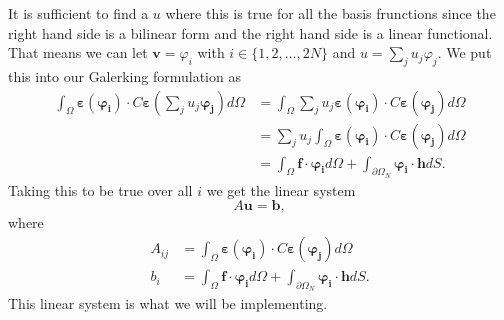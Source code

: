 \documentclass[paper=a4, fontsize=11pt]{scrartcl} %
\begin{document}
It is sufficient to find a $u$ where this is true for all the basis frunctions since the right hand side is a bilinear form and the right hand side is a linear functional. That means we can let $\boldsymbol{v} = \varphi_i$ with $i\in\{1,2,\ldots,2N\}$ and $u = \sum_j u_j\varphi_j$. We put this into our Galerking formulation as
\begin{align*}
\int_{\Omega}\boldsymbol{\varepsilon}(\boldsymbol{\varphi_i})\cdot C\boldsymbol{\varepsilon}\left(\sum_j u_j\boldsymbol{\varphi_j}\right)d\Omega &= \int_{\Omega}\sum_j u_j\boldsymbol{\varepsilon}(\boldsymbol{\varphi_i})\cdot C\boldsymbol{\varepsilon}(\boldsymbol{\varphi_j})d\Omega \\
&=\sum_j u_j\int_{\Omega}\boldsymbol{\varepsilon}(\boldsymbol{\varphi_i})\cdot C\boldsymbol{\varepsilon}(\boldsymbol{\varphi_j})d\Omega \\
&= \int_{\Omega}\boldsymbol{f}\cdot \boldsymbol{\varphi_i} d\Omega + \int_{\partial \Omega_N}\boldsymbol{\varphi_i}\cdot\boldsymbol{h}dS.
\end{align*}
Taking this to be true over all $i$ we get the linear system
\begin{equation*}
A\boldsymbol{u} = \boldsymbol{b},
\end{equation*}
where
\begin{align*}
A_{ij} &= \int_{\Omega}\boldsymbol{\varepsilon}(\boldsymbol{\varphi_i})\cdot C\boldsymbol{\varepsilon}(\boldsymbol{\varphi_j})d\Omega \\
b_i &=  \int_{\Omega}\boldsymbol{f}\cdot \boldsymbol{\varphi_i} d\Omega + \int_{\partial \Omega_N}\boldsymbol{\varphi_i}\cdot\boldsymbol{h}dS.
\end{align*}
This linear system is what we will be implementing.
\end{document}
